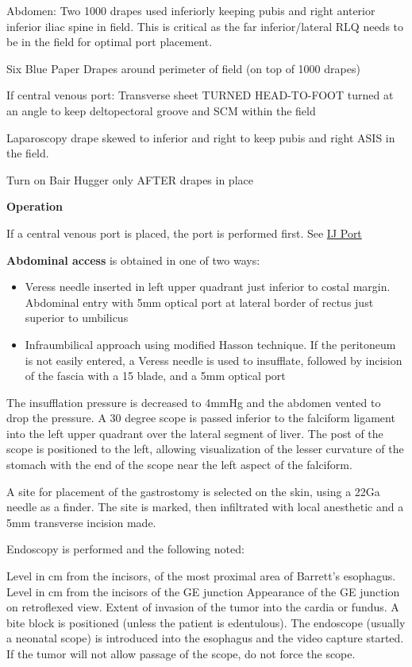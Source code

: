 \documentclass[
]{book}
\providecommand{\tightlist}{%
  \setlength{\itemsep}{0pt}\setlength{\parskip}{0pt}}
\begin{document}
Abdomen: Two 1000 drapes used inferiorly keeping pubis and right anterior inferior iliac spine in field. This is critical as the far inferior/lateral RLQ needs to be in the field for optimal port placement.

Six Blue Paper Drapes around perimeter of field (on top of 1000 drapes)

If central venous port: Transverse sheet TURNED HEAD-TO-FOOT turned at an angle to keep deltopectoral groove and SCM within the field

Laparoscopy drape skewed to inferior and right to keep pubis and right ASIS in the field.

Turn on Bair Hugger only AFTER drapes in place

\textbf{Operation}

If a central venous port is placed, the port is performed first. See \protect\hyperlink{cv_port_salo}{IJ Port}

\textbf{Abdominal access} is obtained in one of two ways:

\begin{itemize}
\tightlist
\item
  Veress needle inserted in left upper quadrant just inferior to costal margin. Abdominal entry with 5mm optical port at lateral border of rectus just superior to umbilicus
\item
  Infraumbilical approach using modified Hasson technique. If the peritoneum is not easily entered, a Veress needle is used to insufflate, followed by incision of the fascia with a 15 blade, and a 5mm optical port
\end{itemize}

The insufflation pressure is decreased to 4mmHg and the abdomen vented to drop the pressure. A 30 degree scope is passed inferior to the falciform ligament into the left upper quadrant over the lateral segment of liver. The post of the scope is positioned to the left, allowing visualization of the lesser curvature of the stomach with the end of the scope near the left aspect of the falciform.

A site for placement of the gastrostomy is selected on the skin, using a 22Ga needle as a finder. The site is marked, then infiltrated with local anesthetic and a 5mm transverse incision made.

Endoscopy is performed and the following noted:

Level in cm from the incisors, of the most proximal area of Barrett's esophagus.
Level in cm from the incisors of the GE junction
Appearance of the GE junction on retroflexed view. Extent of invasion of the tumor into the cardia or fundus.
A bite block is positioned (unless the patient is edentulous). The endoscope (usually a neonatal scope) is introduced into the esophagus and the video capture started. If the tumor will not allow passage of the scope, do not force the scope.
\end{document}
